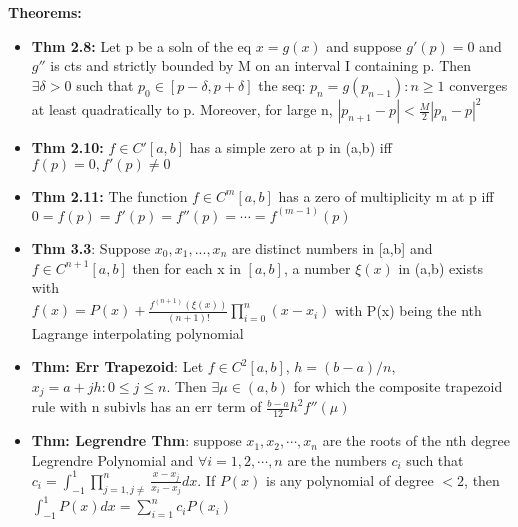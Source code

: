 \documentclass{article}
\begin{document}
\begin{minipage}[t]{0.49\textwidth}
\textbf{Theorems:}
\begin{itemize}
  \item {\textbf{Thm 2.8:} Let p be a soln of the eq $x=g(x)$ and suppose $g'(p)=0$ and $g''$ is cts and strictly bounded by M on an interval I containing p. Then $\exists \delta > 0$ such that $p_0\in[p-\delta, p+\delta]$ the seq: $p_n=g(p_{n-1}): n\ge1$ converges at least quadratically to p. Moreover, for large n, $|p_{n+1}-p|<\frac{M}{2}|p_n-p|^2$ }
  \item {\textbf{Thm 2.10:} $f\in C'[a,b]$ has a simple zero at p in (a,b) iff $f(p)=0,f'(p)\ne0$ }
  \item {\textbf{Thm 2.11:} The function $f\in C^m[a,b]$ has a zero of multiplicity m at p iff $0=f(p)=f'(p)=f''(p)=\cdots=f^{(m-1)}(p)$ }
  \item {\textbf{Thm 3.3}: Suppose $x_0,x_1,...,x_n$ are distinct numbers in [a,b] and $f\in C^{n+1}[a,b]$ then for each x in $[a,b]$, a number $\xi(x)$ in (a,b) exists with}\\
  $f(x)=P(x)+\frac{f^{(n+1)}(\xi(x))}{(n+1)!}\prod_{i=0}^{n}(x-x_i)$
  with P(x) being the nth Lagrange interpolating polynomial
  \item {\textbf{Thm: Err Trapezoid}: Let $f\in C^2[a,b]$, $h=(b-a)/n$, $x_j=a+jh:0\le j\le n$. Then $\exists\mu\in(a,b)$ for which the composite trapezoid rule with n subivls has an err term of $\frac{b-a}{12}h^2f''(\mu)$}
  \item {\textbf{Thm: Legrendre Thm}}: suppose $x_1,x_2,\cdots,x_n$ are the roots of the nth degree Legrendre Polynomial and $\forall i = 1,2,\cdots,n$ are the numbers $c_i$ such that $c_i=\int_{-1}^1\prod_{j=1,j\ne}^n \frac{x-x_j}{x_i-x_j}dx$. If $P(x)$ is any polynomial of degree $<2$, then $\int_{-1}^1P(x)dx=\sum_{i=1}^nc_iP(x_i)$ 
\end{itemize}


\end{minipage}
\end{document}
